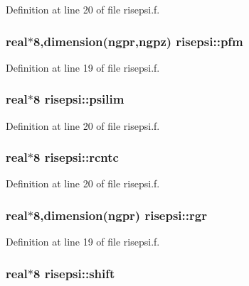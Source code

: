 Definition at line 20 of file risepsi.f.\hypertarget{namespacerisepsi_abc0a1f2c2e97d9f2250a5ceb4116208}{
\subsubsection[pfm]{\setlength{\rightskip}{0pt plus 5cm}real$\ast$8,dimension(ngpr,ngpz) {\bf risepsi::pfm}}}
\label{namespacerisepsi_abc0a1f2c2e97d9f2250a5ceb4116208}




Definition at line 19 of file risepsi.f.\hypertarget{namespacerisepsi_8284737207616a8fb7b5c049b96f2892}{
\subsubsection[psilim]{\setlength{\rightskip}{0pt plus 5cm}real$\ast$8 {\bf risepsi::psilim}}}
\label{namespacerisepsi_8284737207616a8fb7b5c049b96f2892}




Definition at line 20 of file risepsi.f.\hypertarget{namespacerisepsi_efd32323d70597b7c7826a19774b96c7}{
\subsubsection[rcntc]{\setlength{\rightskip}{0pt plus 5cm}real$\ast$8 {\bf risepsi::rcntc}}}
\label{namespacerisepsi_efd32323d70597b7c7826a19774b96c7}




Definition at line 20 of file risepsi.f.\hypertarget{namespacerisepsi_2c87a7df84e82267048de20d41dc8f2c}{
\subsubsection[rgr]{\setlength{\rightskip}{0pt plus 5cm}real$\ast$8,dimension(ngpr) {\bf risepsi::rgr}}}
\label{namespacerisepsi_2c87a7df84e82267048de20d41dc8f2c}




Definition at line 19 of file risepsi.f.\hypertarget{namespacerisepsi_436baf8e4903206b7958c1ce68f457e1}{
\subsubsection[shift]{\setlength{\rightskip}{0pt plus 5cm}real$\ast$8 {\bf risepsi::shift}}}
\label{namespacerisepsi_436baf8e4903206b7958c1ce68f457e1}




